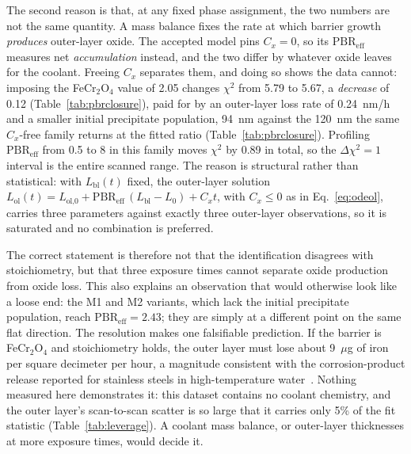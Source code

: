 \documentclass[a4paper,fleqn]{cas-sc}
\begin{document}
The second reason is that, at any fixed phase assignment, the two
numbers are not the same quantity. A mass balance fixes the rate at
which barrier growth \emph{produces} outer-layer oxide. The accepted
model pins $C_x = 0$, so its $\mathrm{PBR}_\text{eff}$ measures net
\emph{accumulation} instead, and the two differ by whatever oxide leaves
for the coolant. Freeing $C_x$ separates them, and doing so shows the
data cannot: imposing the FeCr$_2$O$_4$ value of 2.05 changes $\chi^2$
from 5.79 to 5.67, a \emph{decrease} of 0.12
(Table~\ref{tab:pbrclosure}), paid for by an outer-layer loss rate of
0.24~nm/h and a smaller initial precipitate population, 94~nm against
the 120~nm the same $C_x$-free family returns at the fitted ratio
(Table~\ref{tab:pbrclosure}). Profiling $\mathrm{PBR}_\text{eff}$ from 0.5 to 8 in this family
moves $\chi^2$ by 0.89 in total, so the $\Delta\chi^2 = 1$ interval is
the entire scanned range. The reason is structural rather than
statistical: with $L_\text{bl}(t)$ fixed, the outer-layer solution
$L_\text{ol}(t) = L_\text{ol,0} + \mathrm{PBR}_\text{eff}\,
(L_\text{bl} - L_0) + C_x t$, with $C_x \le 0$ as in
Eq.~\eqref{eq:odeol}, carries three parameters against exactly
three outer-layer observations, so it is saturated and no combination is
preferred.

The correct statement is therefore not that the identification disagrees
with stoichiometry, but that three exposure times cannot separate oxide
production from oxide loss. This also explains an observation that would
otherwise look like a loose end: the M1 and M2 variants, which lack the
initial precipitate population, reach $\mathrm{PBR}_\text{eff} = 2.43$;
they are simply at a different point on the same flat direction. The
resolution makes one falsifiable prediction. If the barrier is
FeCr$_2$O$_4$ and stoichiometry holds, the outer layer must lose about
9~$\mu$g of iron per square decimeter per hour, a magnitude
consistent with the corrosion-product release reported for stainless
steels in high-temperature water~\citep{lister1987release}. Nothing
measured here demonstrates it: this dataset contains no coolant
chemistry, and the outer layer's scan-to-scan scatter is so large that
it carries only 5\% of the fit statistic (Table~\ref{tab:leverage}). A
coolant mass balance, or outer-layer thicknesses at more exposure times,
would decide it.
\end{document}
